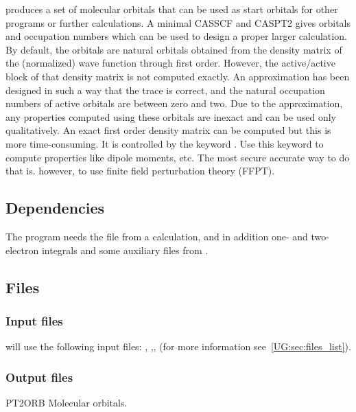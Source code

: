  produces a set of molecular orbitals that can be used
as start orbitals for other programs or further calculations.
A minimal CASSCF and CASPT2 gives orbitals and occupation numbers
which can be used to design a proper larger calculation.
By default, the orbitals are natural orbitals obtained from the
density matrix of the (normalized) wave function through first order.
However, the active/active block of that density matrix is not computed
exactly. An approximation has been designed in such a way that the trace
is correct, and the natural occupation numbers of active orbitals are
between zero and two. Due to the approximation, any properties computed
using these orbitals are inexact and can be used only qualitatively. An exact
first order density matrix can be computed but this is more time-consuming. It
is controlled by the keyword . Use this keyword to compute
properties like dipole moments, etc. The most secure accurate way to do that is.
however, to use finite field perturbation theory (FFPT).

\subsection{Dependencies}
\label{UG:sec:caspt2_dependencies}
The  program needs the  file from a 
calculation, and in addition one- and two-electron integrals and some auxiliary
files from .

\subsection{Files}
\label{UG:sec:caspt2_files}
\subsubsection{Input files}
 will use the following input
files: , ,, 
(for more information see~\ref{UG:sec:files_list}).

\subsubsection{Output files}
\begin{filelist}
\item[PT2ORB]
Molecular orbitals.
\end{filelist}


